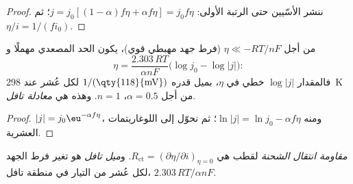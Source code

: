 \begin{proof}
ننشر الأسّيين حتى الرتبة الأولى: $j = j_0[(1 - \alpha)f\eta + \alpha f\eta] = j_0f\eta$؛ ثم
$\eta/i = 1/(fi_0)$.
\end{proof}

\begin{corollary}\label{cor:b3:electrode-kinetics:tafel}
من أجل $\eta \ll -RT/nF$ (فرط جهد مهبطي قوي)، يكون الحد المصعدي
مهملًا و
\[
  \eta = \frac{2.303\,RT}{\alpha nF}\bigl(\log j_0 - \log|j|\bigr):
\]
فالمقدار $\log|j|$ خطي في $\eta$، بميل قدره $1/(\text{\qty{118}{mV}})$ لكل عُشر عند \qty{298}{K} من أجل $\alpha = 0.5$، $n =
1$. وهذه هي \emph{معادلة تافل}.
\end{corollary}

\begin{proof}
$|j| = j_0\eu^{-\alpha f\eta}$، ومنه $\ln|j| = \ln j_0 - \alpha f\eta$؛ ثم نحوّل إلى اللوغاريتمات العشرية.
\end{proof}

\begin{definition}\label{def:b3:electrode-kinetics:charge-transfer}
\emph{مقاومة انتقال الشحنة} لقطب
هي $R_{\mathrm{ct}} = (\partial\eta/\partial i)_{\eta = 0}$. و\emph{ميل تافل}
هو تغير فرط الجهد لكل عُشر من التيار في منطقة تافل،
$2.303\,RT/\alpha nF$.
\end{definition}

